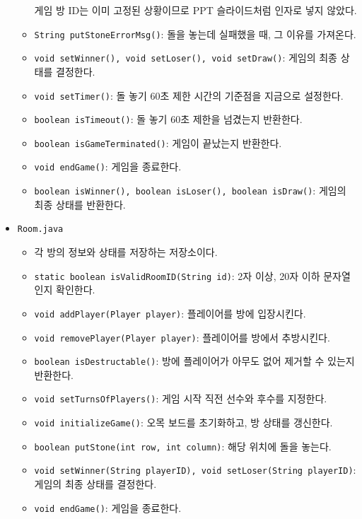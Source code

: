 \documentclass[a4paper, 10pt]{article}
\begin{document}
\begin{itemize}
\begin{itemize}
    게임 방 ID는 이미 고정된 상황이므로 PPT 슬라이드처럼 인자로 넣지 않았다.
    \item \texttt{String putStoneErrorMsg()}: 돌을 놓는데 실패했을 때, 그 이유를 가져온다.
    \item \texttt{void setWinner(), void setLoser(), void setDraw()}: 게임의 최종 상태를 결정한다.
    \item \texttt{void setTimer()}: 돌 놓기 60초 제한 시간의 기준점을 지금으로 설정한다.
    \item \texttt{boolean isTimeout()}: 돌 놓기 60초 제한을 넘겼는지 반환한다.
    \item \texttt{boolean isGameTerminated()}: 게임이 끝났는지 반환한다.
    \item \texttt{void endGame()}: 게임을 종료한다.
    \item \texttt{boolean isWinner(), boolean isLoser(), boolean isDraw()}: 게임의 최종 상태를 반환한다.
  \end{itemize}
  \item \texttt{Room.java}
  \begin{itemize}
    \item[] 각 방의 정보와 상태를 저장하는 저장소이다.
    \item \texttt{static boolean isValidRoomID(String id)}: 2자 이상, 20자 이하 문자열인지 확인한다.
    \item \texttt{void addPlayer(Player player)}: 플레이어를 방에 입장시킨다.
    \item \texttt{void removePlayer(Player player)}: 플레이어를 방에서 추방시킨다.
    \item \texttt{boolean isDestructable()}: 방에 플레이어가 아무도 없어 제거할 수 있는지 반환한다.
    \item \texttt{void setTurnsOfPlayers()}: 게임 시작 직전 선수와 후수를 지정한다.
    \item \texttt{void initializeGame()}: 오목 보드를 초기화하고, 방 상태를 갱신한다.
    \item \texttt{boolean putStone(int row, int column)}: 해당 위치에 돌을 놓는다.
    \item \texttt{void setWinner(String playerID), void setLoser(String playerID)}: 게임의 최종 상태를 결정한다.
    \item \texttt{void endGame()}: 게임을 종료한다.
  \end{itemize}
\end{itemize}
\end{document}
